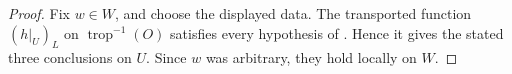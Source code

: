 
\begin{proof}
Fix \(w\in W\), and choose the displayed data.  The transported function
\((h|_U)_L\) on \(\operatorname{trop}^{-1}(O)\) satisfies every hypothesis of
.  Hence it
gives the stated three conclusions on \(U\).  Since \(w\) was arbitrary,
they hold locally on \(W\).
\end{proof}
